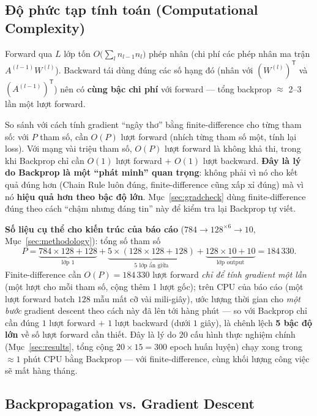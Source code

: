 \documentclass[12pt,a4paper]{article}
\newcommand{\T}{^{\mathsf{T}}}
\begin{document}
\subsection{Độ phức tạp tính toán (Computational Complexity)}
\label{sec:complexity}

Forward qua $L$ lớp tốn $O\!\big(\sum_l n_{l-1}n_l\big)$ phép nhân (chi phí
các phép nhân ma trận $A^{(l-1)}W^{(l)}$). Backward tái dùng đúng các số
hạng đó (nhân với $(W^{(l)})\T$ và $(A^{(l-1)})\T$) nên có \textbf{cùng bậc
chi phí} với forward --- tổng backprop $\approx$ 2--3 lần một lượt forward.

So sánh với cách tính gradient ``ngây thơ'' bằng finite-difference cho từng
tham số: với $P$ tham số, cần $O(P)$ lượt forward (nhích từng tham số một,
tính lại loss). Với mạng vài triệu tham số, $O(P)$ lượt forward là không
khả thi, trong khi Backprop chỉ cần $O(1)$ lượt forward $+$ $O(1)$ lượt
backward. \textbf{Đây là lý do Backprop là một ``phát minh'' quan trọng}:
không phải vì nó cho kết quả đúng hơn (Chain Rule luôn đúng, finite-difference
cũng xấp xỉ đúng) mà vì nó \textbf{hiệu quả hơn theo bậc độ lớn}. Mục~\ref{sec:gradcheck}
dùng finite-difference đúng theo cách ``chậm nhưng đáng tin'' này để kiểm tra
lại Backprop tự viết.

\textbf{Số liệu cụ thể cho kiến trúc của báo cáo} ($784\to128^{\times6}\to10$,
Mục~\ref{sec:methodology}): tổng số tham số
$$P = \underbrace{784{\times}128{+}128}_{\text{lớp 1}} + \underbrace{5\times(128{\times}128{+}128)}_{\text{5 lớp ẩn giữa}} + \underbrace{128{\times}10{+}10}_{\text{lớp output}} = 184\,330.$$
Finite-difference cần $O(P)=184\,330$ lượt forward \emph{chỉ để tính
gradient một lần} (một lượt cho mỗi tham số, cộng thêm 1 lượt gốc); trên
CPU của báo cáo (một lượt forward batch $128$ mẫu mất cỡ vài mili-giây),
ước lượng thời gian cho \emph{một bước} gradient descent theo cách này đã
lên tới hàng phút --- so với Backprop chỉ cần đúng $1$ lượt forward $+$
$1$ lượt backward (dưới $1$ giây), là chênh lệch \textbf{5 bậc độ lớn} về
số lượt forward cần thiết. Đây là lý do $20$ cấu hình thực nghiệm chính
(Mục~\ref{sec:results}, tổng cộng $20\times15=300$ epoch huấn luyện) chạy
xong trong $\approx1$ phút CPU bằng Backprop --- với finite-difference,
cùng khối lượng công việc sẽ mất hàng tháng.

\subsection{Backpropagation vs. Gradient Descent}
\label{sec:bp_vs_gd}
\end{document}
